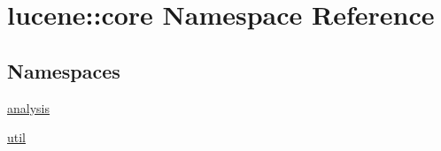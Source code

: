 \hypertarget{namespacelucene_1_1core}{}\section{lucene\+:\+:core Namespace Reference}
\label{namespacelucene_1_1core}
\subsection*{Namespaces}
\begin{DoxyCompactItemize}
\item 
 \mbox{\hyperlink{namespacelucene_1_1core_1_1analysis}{analysis}}
\item 
 \mbox{\hyperlink{namespacelucene_1_1core_1_1util}{util}}
\end{DoxyCompactItemize}
